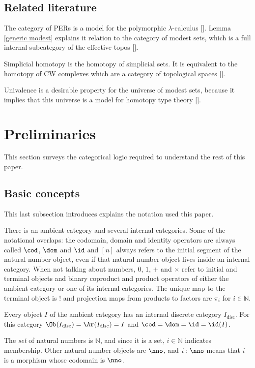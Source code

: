 \documentclass{tac}
\newcommand\N{\mathbb N}
\newcommand\disc{_{\mathrm{disc}}}
\newcommand\bang{!}
\newcommand\of{:}
\newcommand\citep[1]{[\cite{#1}]}
\begin{document}
\subsection{Related literature}
The category of PERs is a model for the polymorphic $\lambda$-calculus \citep{MR1099188,MR2074932,MR1003196}. Lemma \ref{generic modest} explains it relation to the category of modest sets, which is a full internal subcategory of the effective topos \citep{MR1097022,MR1023803,MR2479466}.

Simplicial homotopy is the homotopy of simplicial sets. It is equivalent to the homotopy of CW complexes which are a category of topological spaces \citep{Hovey99,GJSHT}.

Univalence is a desirable property for the universe of modest sets, because it implies that this universe is a model for homotopy type theory \citep{hottbook,KLV12}.

\section{Preliminaries}
This section surveys the categorical logic required to understand the rest of this paper.

\subsection{Basic concepts} This last subsection introduces explains the notation used this paper. 

There is an ambient category and several internal categories. Some of the notational overlaps: the codomain, domain and identity operators are always called $\cod$, $\dom$ and $\id$ and $[n]$ always refers to the initial segment of the natural number object, even if that natural number object lives inside an internal category. When not talking about numbers, $0$, $1$, $+$ and $\times$ refer to initial and terminal objects and binary coproduct and product operators of either the ambient category or one of its internal categories. The unique map to the terminal object is $\bang$ and projection maps from products to factors are $\pi_i$ for $i\in \N$.

Every object $I$ of the ambient category has an internal discrete category $I\disc$. For this category $\Ob(I\disc)=\Ar(I\disc)=I$ and $\cod=\dom=\id=\id(I)$.

The \emph{set} of natural numbers is $\N$, and since it is a set, $i\in \N$ indicates membership. Other natural number objects are $\nno$, and $i\of\nno$ means that $i$ is a morphism whose codomain is $\nno$.
\end{document}
